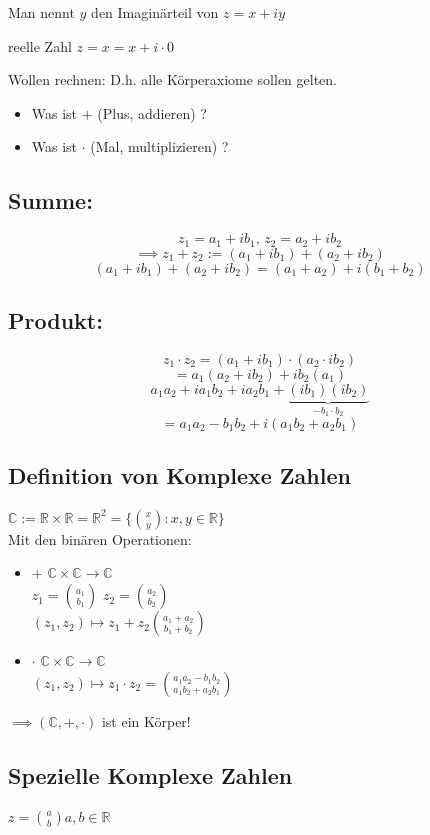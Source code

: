 \documentclass[fleqn]{scrbook}
\newcommand{\qq}[1]{\glqq #1\grqq}
\newcommand{\R}{\mathbb{R}}
\begin{document}
Man nennt $y$ den Imaginärteil von $z=x+iy$

reelle Zahl $z=x=x+i \cdot 0$

Wollen rechnen: D.h. alle Körperaxiome sollen gelten.

\begin{itemize}
 \item Was ist \qq{$+$} (Plus, addieren) ?
 \item Was ist \qq{$ \cdot $} (Mal, multiplizieren) ?
\end{itemize}

\subsection{Summe:} $$z_1 = a_1 + ib_1 \text{, } z_2 = a_2 + ib_2$$ $$\implies z_1 + z_2 := (a_1 + ib_1) + (a_2+ib_2)$$ $$(a_1 + ib_1) + (a_2+ib_2) = (a_1 + a_2) + i(b_1+b_2)$$

\subsection{Produkt:} $$z_1  \cdot  z_2 = (a_1 + ib_1)  \cdot  (a_2  \cdot  ib_2)$$ 
$$=a_1(a_2 + ib_2) + ib_2(a_1)$$
$$a_1a_2 + ia_1b_2 + ia_2b_1 + \underbrace{(ib_1)(ib_2)}_{-b_1 \cdot b_2}$$
$$=a_1a_2 -b_1b_2 + i(a_1b_2 + a_2b_1)$$

\subsection{Definition von Komplexe Zahlen}
$\mathbb{C} := \R \times \R = \R^2=\{\binom{x}{y}:x,y \in \R\}$\\
Mit den binären Operationen:
\begin{itemize}
\item \qq{$+$} $\mathbb{C} \times \mathbb{C} \rightarrow \mathbb{C}$\\ $z_1 = \binom{a_1}{b_1}$ $z_2 = \binom{a_2}{b_2}$\\ $(z_1, z_2) \mapsto z_1 + z_2 \binom{a_1 + a_2}{b_1 + b_2}$
\item \qq{$ \cdot $} $\mathbb{C} \times \mathbb{C} \rightarrow \mathbb{C}$\\$(z_1, z_2) \mapsto z_1  \cdot  z_2 = \binom{a_1a_2 - b_1b_2}{a_1b_2+a_2b_1}$
\end{itemize}
$\implies (\mathbb{C},+, \cdot )$ ist ein Körper!
\subsection{Spezielle Komplexe Zahlen}
$z=\binom{a}{b} a,b \in \R$
\end{document}

